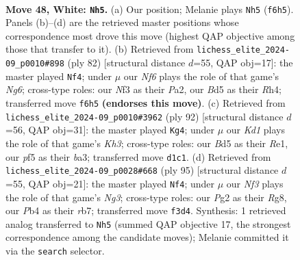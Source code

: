 \documentclass[11pt]{article}
\begin{document}
\clearpage

\begin{figure}[p]\centering
\begin{subfigure}{0.46\textwidth}\centering
\resizebox{\linewidth}{!}{%
\newchessgame
\chessboard[
  setfen={1k3r2/8/5N2/1b1B1p2/1P5R/4rN2/2R3P1/3K4 w - - 11 48},
  showmover=false,
  pgfstyle=straightmove, color=movearrow, markmove={f6-h5}
]}
\caption{}
\end{subfigure}\hfill
\begin{subfigure}{0.46\textwidth}\centering
\resizebox{\linewidth}{!}{%
\newchessgame
\chessboard[
  setfen={4b3/ppp5/6N1/5k1P/7R/2P1K3/Pr6/8 w - - 2 42},
  showmover=false,
  pgfstyle=straightmove, color=movearrow, markmove={g6-f4}
]}
\caption{}
\end{subfigure}
\\[4pt]
\begin{subfigure}{0.46\textwidth}\centering
\resizebox{\linewidth}{!}{%
\newchessgame
\chessboard[
  setfen={8/5k2/8/3r4/p1pBN3/brPb1P1K/5R2/4R3 w - - 0 47},
  showmover=false,
  pgfstyle=straightmove, color=movearrow, markmove={h3-g4}
]}
\caption{}
\end{subfigure}\hfill
\begin{subfigure}{0.46\textwidth}\centering
\resizebox{\linewidth}{!}{%
\newchessgame
\chessboard[
  setfen={5kr1/1R6/6nR/2P1p3/2NpP1r1/3P4/8/7K b - - 0 48},
  showmover=false,
  pgfstyle=straightmove, color=movearrow, markmove={g6-f4}
]}
\caption{}
\end{subfigure}
\caption{\textbf{Move 48, White: \texttt{Nh5}.} (a) Our position; Melanie plays \texttt{Nh5} (\texttt{f6h5}). Panels (b)--(d) are the retrieved master positions whose correspondence most drove this move (highest QAP objective among those that transfer to it). (b) Retrieved from \texttt{lichess\_elite\_2024-09\_p0010\#898} (ply 82) [structural distance $d$=55, QAP obj=17]: the master played \texttt{Nf4}; under $\mu$ our \emph{Nf6} plays the role of that game's \emph{Ng6}; cross-type roles: our \emph{N}f3 as their \emph{P}a2, our \emph{B}d5 as their \emph{R}h4; transferred move \texttt{f6h5} \textbf{(endorses this move)}. (c) Retrieved from \texttt{lichess\_elite\_2024-09\_p0010\#3962} (ply 92) [structural distance $d$=56, QAP obj=31]: the master played \texttt{Kg4}; under $\mu$ our \emph{Kd1} plays the role of that game's \emph{Kh3}; cross-type roles: our \emph{B}d5 as their \emph{R}e1, our \emph{p}f5 as their \emph{b}a3; transferred move \texttt{d1c1}. (d) Retrieved from \texttt{lichess\_elite\_2024-09\_p0028\#668} (ply 95) [structural distance $d$=55, QAP obj=21]: the master played \texttt{Nf4}; under $\mu$ our \emph{Nf3} plays the role of that game's \emph{Ng3}; cross-type roles: our \emph{P}g2 as their \emph{R}g8, our \emph{P}b4 as their \emph{r}b7; transferred move \texttt{f3d4}. Synthesis: 1 retrieved analog transferred to \texttt{Nh5} (summed QAP objective 17, the strongest correspondence among the candidate moves); Melanie committed it via the \texttt{search} selector.}
\label{fig:thought-m94}
\end{figure}
\end{document}
